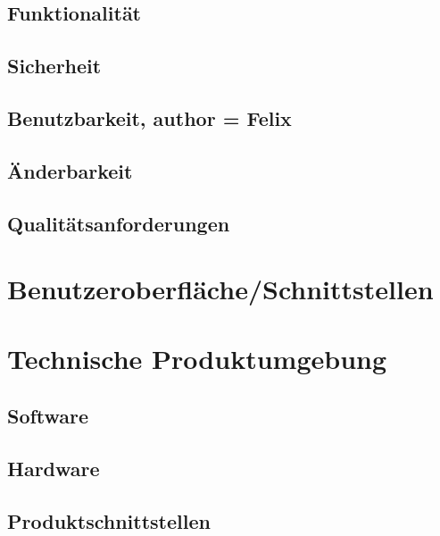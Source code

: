 \documentclass[parskip=full]{scrartcl} %
\begin{document}
\subsection{Funktionalität}
\subsection{Sicherheit}
\subsection{Benutzbarkeit, author = Felix}
\subsection{Änderbarkeit}
\subsection{Qualitätsanforderungen}


\newpage



\section{Benutzeroberfläche/Schnittstellen}
\newpage



\section{Technische Produktumgebung}

\subsection{Software}
\subsection{Hardware}
\subsection{Produktschnittstellen}
\newpage
\end{document}
